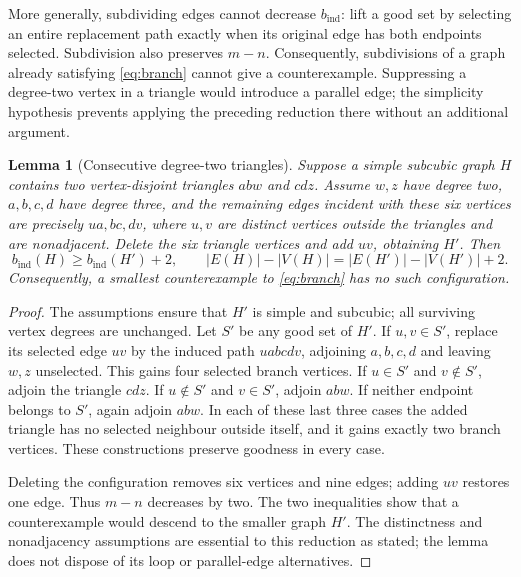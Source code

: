 \documentclass[11pt]{article}
\newtheorem{lemma}[theorem]{Lemma}
\newcommand{\bind}{b_{\mathrm{ind}}}
\begin{document}
More generally, subdividing edges cannot decrease $\bind$: lift a
good set by selecting an entire replacement path exactly when its
original edge has both endpoints selected. Subdivision also preserves
$m-n$. Consequently, subdivisions of a graph already satisfying
\eqref{eq:branch} cannot give a counterexample. Suppressing a
degree-two vertex in a triangle would introduce a parallel edge;
the simplicity hypothesis prevents applying the preceding reduction
there without an additional argument.

\begin{lemma}[Consecutive degree-two triangles]\label{lem:triangle-pair}
Suppose a simple subcubic graph $H$ contains two vertex-disjoint
triangles $abw$ and $cdz$. Assume $w,z$ have degree two,
$a,b,c,d$ have degree three, and the remaining edges incident with
these six vertices are precisely $ua,bc,dv$, where $u,v$ are distinct
vertices outside the triangles and are nonadjacent.
Delete the six triangle vertices and add $uv$, obtaining $H'$.
Then
\[
 \bind(H)\geq\bind(H')+2,\qquad
 |E(H)|-|V(H)|=|E(H')|-|V(H')|+2.
\]
Consequently, a smallest counterexample to \eqref{eq:branch} has
no such configuration.
\end{lemma}
\begin{proof}
The assumptions ensure that $H'$ is simple and subcubic; all surviving
vertex degrees are unchanged. Let $S'$ be any good set of $H'$.
If $u,v\in S'$, replace its selected edge $uv$ by the induced path
$uabcdv$, adjoining $a,b,c,d$ and leaving $w,z$ unselected.
This gains four selected branch vertices.
If $u\in S'$ and $v\notin S'$, adjoin the triangle $cdz$.
If $u\notin S'$ and $v\in S'$, adjoin $abw$.
If neither endpoint belongs to $S'$, again adjoin $abw$.
In each of these last three cases the added triangle has no selected
neighbour outside itself, and it gains exactly two branch vertices.
These constructions preserve goodness in every case.

Deleting the configuration removes six vertices and nine edges;
adding $uv$ restores one edge. Thus $m-n$ decreases by two.
The two inequalities show that a counterexample would descend to
the smaller graph $H'$. The distinctness and nonadjacency assumptions
are essential to this reduction as stated; the lemma does not dispose
of its loop or parallel-edge alternatives.
\end{proof}
\end{document}
